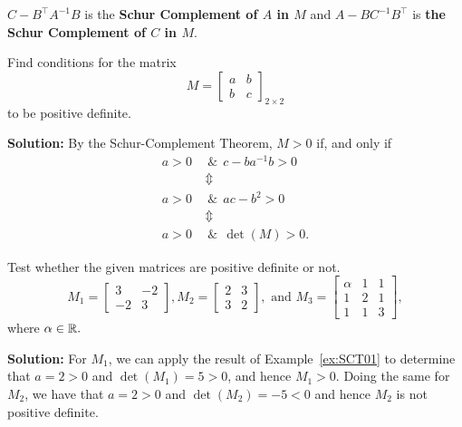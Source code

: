 		
\begin{definition}
 $C-B^\top A^{-1}B$ is the \textbf{Schur Complement of $A$ in $M$} and $A-B C^{-1} B^\top$ is \textbf{the Schur Complement of $C$ in $M$}.
\end{definition} 

\begin{example}
\label{ex:SCT01}
Find conditions for the matrix
$$M=\left[ \begin{array}{cc} a & b \\ b & c\end{array} \right]_{2 \times 2}$$
to be positive definite.
\end{example}

\textbf{Solution:} By the Schur-Complement Theorem,  $M >0$ if, and only if
\begin{align*}
    a> 0 & ~~\& ~~c - ba^{-1}b >0 \\
    & ~\Updownarrow \\
    a >0 & ~~\& ~~ac - b^2 > 0 \\
        & ~\Updownarrow \\
    a > 0 & ~~\& ~~ \det(M) > 0.
\end{align*}

\Qed


\begin{example} Test whether the given matrices are positive definite or not.
$$M_1=\left[ \begin{array}{rr} 3 & -2 \\ -2 & 3\end{array} \right], M_2 = \left[ \begin{array}{rr} 2 & 3 \\ 3 & 2\end{array} \right], \text{ and } M_3 = \left[ \begin{array}{rrr} \alpha & 1 & 1 \\ 1 & 2 & 1 \\ 1 & 1 & 3\end{array} \right], $$
where $\alpha \in \mathbb R.$
\end{example}

\textbf{Solution:} For $M_1$, we can apply the result of Example~\ref{ex:SCT01} to determine that $a=2>0$ and $\det(M_1)=5 >0$, and hence $M_1 >0$. Doing the same for $M_2$, we have that
$a=2>0$ and $\det(M_2)=-5<0$ and hence $M_2$ is not positive definite.\\

